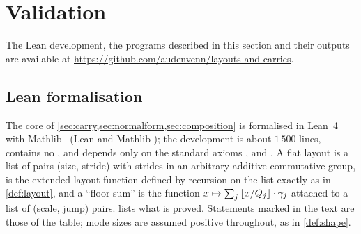 \section{Validation}\label{sec:mechanization}

The Lean development, the programs described in this section and their outputs are available at
\url{https://github.com/audenvenn/layouts-and-carries}.

\subsection{Lean formalisation}\label{sec:lean}

The core of \cref{sec:carry,sec:normalform,sec:composition} is formalised in Lean~4~\cite{moura2021}
with Mathlib~\cite{mathlib2020} (Lean and Mathlib ); the development is about
$1\,500$ lines, contains no , and depends only on the standard axioms ,
 and . A flat layout is a list of pairs (size, stride)
with strides in an arbitrary additive commutative group,  is the extended layout
function defined by recursion on the list exactly as in \cref{def:layout}, and a ``floor sum'' is
the function $x\mapsto\sum_j\left\lfloor x/Q_j \right\rfloor\cdot\gamma_j$ attached to a list of (scale, jump) pairs.
 lists what is proved. Statements marked \mech{} in the text are those of the
table; mode sizes are assumed positive throughout, as in \cref{def:shape}.

